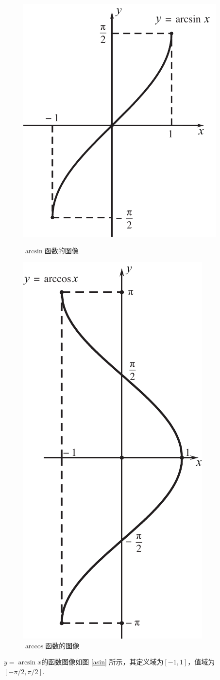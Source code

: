 \begin{figure}[!htb]
	\begin{minipage}{0.49\linewidth}
		\centering
		\includegraphics[width=0.89\linewidth]{pic/C-F/arcsin.pdf}
		\caption{$\arcsin$函数的图像}
		\label{asin}
	\end{minipage}
	\begin{minipage}{0.49\linewidth}
		\centering
		\includegraphics[width=0.51\linewidth]{pic/C-F/arccos.pdf}
		\caption{$\arccos$函数的图像}
		\label{acos}
	\end{minipage}
\end{figure}
$y = \arcsin x$的函数图像如图 \ref{asin} 所示，其定义域为$[-1, 1]$，值域为$[-\pi/2, \pi/2]$.


